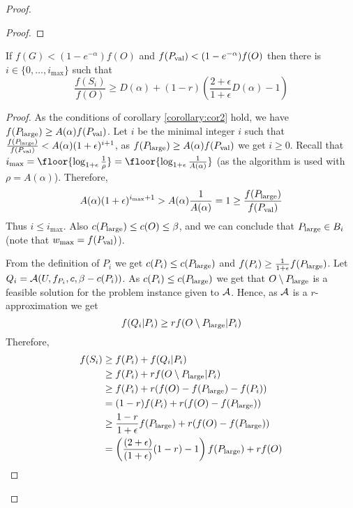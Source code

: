 \begin{proof}
\begin{proof}
			
		\end{proof}

	\begin{corollary}
		\label{corollary:cor3}
			If $f(G)< (1-e^{-\alpha})f(O)$ and $f(P_{\text{val}}) < (1-e^{-\alpha})f(O)$ then
			there is $i\in \{0, \ldots, i_{\max}\}$ such that
		$$\frac{f(S_i)}{f(O)} \geq D(\alpha) + (1-r)\left( \frac{2+\epsilon}{1+\epsilon} D(\alpha) -1 \right)$$
	\end{corollary}
\begin{proof}
		As the conditions of corollary \ref{corollary:cor2} hold, we have
		$f(P_{\text{large}}) \geq A(\alpha) f(P_{\text{val}})$.
		 Let $i$ be the minimal integer $i$ such
		that $\frac{f(P_{\text{large}})}{f(P_{\text{val}})} < A(\alpha)(1+\epsilon) ^{i+1}$, as $f(P_{\text{large}}) \geq A(\alpha) f(P_{\text{val}})$ we get $i\geq 0$.
		Recall that $i_{\max}= \floor{\log_{1+\epsilon} \frac{1}{\rho} } =
		\floor{\log_{1+\epsilon} \frac{1}{A(\alpha)}} $ (as the algorithm is used
			with $\rho=A(\alpha)$).
			Therefore,
			$$A(\alpha) (1+\epsilon) ^{i_{\max} +1}
			> A(\alpha) \frac{1}{A(\alpha) } = 1 \geq \frac{f(P_{\text{large}})}{f(P_{\text{val}})}$$
			Thus $i\leq i_{\max}$.
			Also $c(P_{\text{large}}) \leq c(O) \leq \beta$, and we can conclude that
			$P_{\text{large}} \in B_i$ (note that $w_{\max} = f(P_{\text{val}})$).
			
			From the definition of $P_i$ we get $c(P_i)\leq c(P_{\text{large}})$ and
			$f(P_i) \geq \frac{1}{1+\epsilon} f(P_{\text{large}})$.
			Let $Q_i  =  \mathcal{A}(U, f_{P_i}, c, \beta - c(P_i))$.
			As $c(P_i) \leq c(P_{\text{large}})$ we get that $O\setminus P_{\text{large}}$
			is a feasible solution for the problem instance given to $\mathcal{A}$.
			Hence, as $\mathcal{A}$ is a $r$-approximation we get
			$$f(Q_i | P_i) \geq r f(O\setminus P_{\text{large}}| P_i)$$
			Therefore,
			\begin{align*}
			f(S_{i})
			&
			\geq f(P_i) + f(Q_i|P_i)
			\\ &
			\geq f(P_i) + r f(O \setminus P_{\text{large}} | P_i)
			\\ &
			\geq f(P_i) + r(f(O) - f(P_{\text{large}}) - f(P_i))
			\\ &
			= (1-r)f(P_i) + r(f(O) - f(P_{\text{large}}))
			\\ &
			\geq \frac{1-r}{1 + \epsilon}f(P_{\text{large}}) + r(f(O) - f(P_{\text{large}}))
			\\ &
			= \left(
			\frac{(2 + \epsilon)}{(1 + \epsilon)}(1-r) - 1
			\right)
			f(P_{\text{large}})
			+ rf(O)
			\label{eq:sub:bucket}
			\end{align*}
			

\end{proof}
\end{proof}
